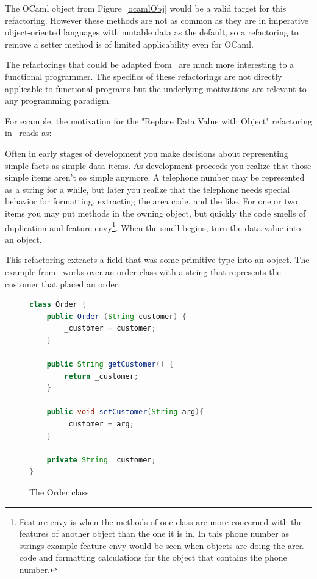 The OCaml object from Figure~\ref{ocamlObj} would be a valid target for this refactoring. However these methods are not as common as they are in imperative object-oriented languages with mutable data as the default, so a refactoring to remove a setter method is of limited applicability even for OCaml.

The refactorings that could be adapted from~\cite{fowler} are much more interesting to a functional programmer. The specifics of these refactorings are not directly applicable to functional programs but the underlying motivations are relevant to any programming paradigm. 

For example, the motivation for the "Replace Data Value with Object" refactoring in~\citep[pg. 175]{fowler} reads as:

\begin{displayquote}
Often in early stages of development you make decisions about representing simple facts as simple data items. As development proceeds you realize that those simple items aren't so simple anymore. A telephone number may be represented as a string for a while, but later you realize that the telephone needs special behavior for formatting, extracting the area code, and the like. For one or two items you may put methods in the owning object, but quickly the code smells of duplication and feature envy\footnote{Feature envy is when the methods of one class are more concerned with the features of another object than the one it is in. In this phone number as strings example feature envy would be seen when objects are doing the area code and formatting calculations for the object that contains the phone number.}. When the smell begins, turn the data value into an object.
\end{displayquote}

This refactoring extracts a field that was some primitive type into an object. The example from~\citep{fowler} works over an order class with a string that represents the customer that placed an order.

\begin{figure}[t]
\begin{lstlisting}[language = java,tabsize=4]
class Order {
	public Order (String customer) {
		_customer = customer;	
	}
	
	public String getCustomer() {
		return _customer;
	}
	
	public void setCustomer(String arg){
		_customer = arg;	
	}
	
	private String _customer;
}
\end{lstlisting}
\caption{The Order class}
\end{figure}

